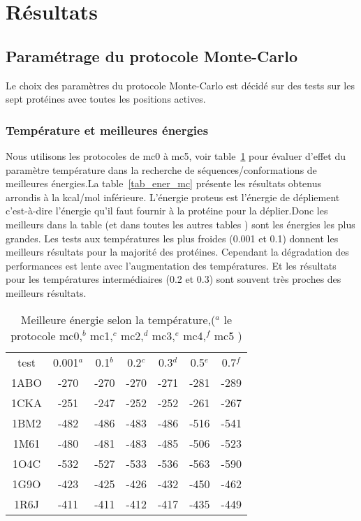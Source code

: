 \clearpage

    \section{Résultats} 

    \subsection{Paramétrage du protocole Monte-Carlo}

Le choix des paramètres du protocole Monte-Carlo est décidé sur des tests sur les sept protéines avec toutes les positions actives.


   \subsubsection{Température et meilleures énergies} 
Nous utilisons les protocoles de mc0 à mc5, voir table~\ref{tab:ener_mc} pour évaluer d'effet du paramètre température dans la recherche de séquences/conformations de meilleures énergies.La table~\ref{tab_ener_mc} présente les résultats obtenus arrondis à la kcal/mol inférieure. L'énergie proteus est l'énergie de dépliement c'est-à-dire l'énergie qu'il faut fournir à la protéine pour la déplier.Donc les meilleurs dans la table (et dans toutes les autres tables ) sont les énergies les plus grandes. Les tests aux températures les plus froides (0.001 et 0.1) donnent les meilleurs résultats  pour la majorité des protéines. Cependant la dégradation des performances est lente avec l'augmentation des températures. Et les résultats pour les températures intermédiaires (0.2 et 0.3) sont souvent très proches des meilleurs résultats.    

    \begin{table}[!htbp]
      \centering


      \begin{tabular}{ccccccc}

     
        \toprule
         test & 0.001$^a$ & 0.1$^b$ & 0.2$^c$  & 0.3$^d$ & 0.5$^e$ & 0.7$^f$  \\
        \cmidrule{1-7}
        1ABO & -270 & -270 & -270 & -271 & -281  & -289 \\      
        1CKA & -251 & -247 & -252 & -252 & -261  & -267 \\  
        1BM2 & -482 & -486 & -483 & -486 & -516  & -541 \\  
        1M61 & -480 & -481 & -483 & -485 & -506  & -523 \\  
        1O4C & -532 & -527 & -533 & -536 & -563  & -590 \\  
        1G9O & -423 & -425 & -426 & -432 & -450  & -462 \\  
        1R6J & -411 & -411 & -412 & -417 & -435  & -449 \\  

        \bottomrule        
      \end{tabular}
      

      \caption{Meilleure énergie selon la température,($^a$ le protocole mc0,$^b$ mc1,$^c$  mc2,$^d$ mc3,$^e$ mc4,$^f$ mc5 )}    
      \label{tab:ener_mc}
    \end{table}
 
